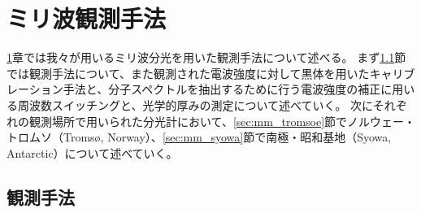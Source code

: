 \chapter{ミリ波観測手法}
\label{ch:mm_obs}

\ref{ch:mm_obs}章では我々が用いるミリ波分光を用いた観測手法について述べる。
まず\ref{sec:mm_obs}節では観測手法について、また観測された電波強度に対して黒体を用いたキャリブレーション手法と、分子スペクトルを抽出するために行う電波強度の補正に用いる周波数スイッチングと、光学的厚みの測定について述べていく。
次にそれぞれの観測場所で用いられた分光計において、\ref{sec:mm_tromsoe}節でノルウェー・トロムソ（Troms\o , Norway）、\ref{sec:mm_syowa}節で南極・昭和基地（Syowa, Antarctic）について述べていく。

\section{観測手法}
\label{sec:mm_obs}

